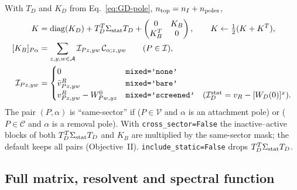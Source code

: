 \documentclass[11pt,a4paper]{article}
\newcommand{\code}[1]{\texttt{#1}}
\newcommand{\vR}{v^{R}}
\newcommand{\vbR}{\bar v^{R}}
\begin{document}
With $T_D$ and $K_D$ from Eq.~\eqref{eq:GD-pole}, $n_{\rm top}=n_I+n_{\rm poles}$,
\begin{align}
  K&=\operatorname{diag}(K_D)+T_D^{T}\Sigma_{\rm stat}T_D
  +\begin{pmatrix}0&K_B\\K_B^{T}&0\end{pmatrix},\qquad K\leftarrow\tfrac12(K+K^{T}),
  \label{eq:K}\\
  [K_B]_{P\alpha}&=\sum_{z,y,w\in\mathcal A}\mathcal I_{Pz,yw}\,\mathcal C_{\alpha;z,yw}
  \qquad(P\in\mathcal I),
  \label{eq:KB}\\
  \mathcal I_{Pz,yw}&=\begin{cases}
  0&\code{mixed='none'}\\
  \vbR_{Pz,yw}&\code{mixed='bare'}\\
  \vR_{Pz,yw}-W^{0}_{Pw,yz}&\code{mixed='screened'}\quad(\mathcal I^{\rm stat}_D=v_R-[W_D(0)]^{x}).
  \end{cases}
  \label{eq:kernel}
\end{align}
The pair $(P,\alpha)$ is ``same-sector'' if ($P\in\mathcal V$ and $\alpha$ is
an attachment pole) or ($P\in\mathcal C$ and $\alpha$ is a removal pole).
With \code{cross\_sector=False} the inactive--active blocks of both
$T_D^{T}\Sigma_{\rm stat}T_D$ and $K_B$ are multiplied by the same-sector
mask; the default keeps all pairs (Objective~II).  \code{include\_static=False}
drops $T_D^{T}\Sigma_{\rm stat}T_D$.

\subsection{Full matrix, resolvent and spectral function}
\end{document}
